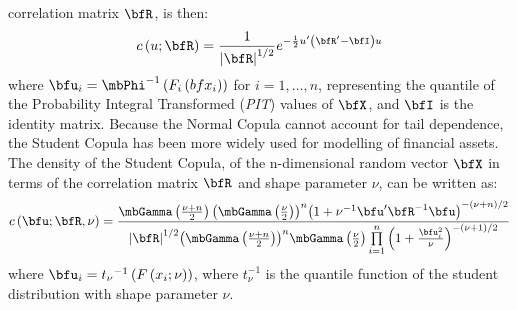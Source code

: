 correlation matrix $\bfR$, is then:
\begin{equation}\label{eq:copula5}
c\left( {u;\bfR} \right) = \frac{1}{{{{\left| \bfR \right|}^{1/2}}}}{e^{ - \frac{1}{2}u'\left( {\bfR' - \bfI} \right)u}}
\end{equation}
where ${\bfu_i} = {\mbPhi ^{ - 1}}\left( {{F_i}\left( {{bfx_i}} \right)} \right)$
for $i=1,\dots,n$, representing the quantile of the Probability Integral
Transformed (\emph{PIT}) values of $\bfX$, and $\bfI$ is the identity matrix.
Because the Normal Copula cannot account for tail dependence, the Student Copula
has been more widely used for modelling of financial assets. The density of the
Student Copula, of the n-dimensional random vector $\bfX$ in terms of the
correlation matrix $\bfR$ and shape parameter $\nu$, can be written as:
\begin{equation}\label{eq:copula6}
c\left( {\bfu;\bfR,\nu } \right) = \frac{{\mbGamma \left( {\frac{{\nu  + n}}{2}} \right){{\left( {\mbGamma \left( {\frac{\nu }
{2}} \right)} \right)}^n}{{\left( {1 + {\nu ^{ - 1}}\bfu'{\bfR^{ - 1}}\bfu} \right)}^{ - \left( {\nu  + n} \right)/2}}}}
{{{{\left| \bfR \right|}^{1/2}}{{\left( {\mbGamma \left( {\frac{{\nu  + n}}{2}} \right)} \right)}^n}\mbGamma \left( {\frac{\nu }
{2}} \right)\prod\limits_{i = 1}^n {{{\left( {1 + \frac{{\bfu_i^2}}{\nu }} \right)}^{ - \left( {\nu  + 1} \right)/2}}} }}
\end{equation}\label{eq:copula7}
where ${\bfu_i} = {t_\nu }^{ - 1}\left( {F\left( {{x_i};\nu } \right)} \right)$,
where $t_\nu^{-1}$ is the quantile function of the student distribution with
shape parameter $\nu$.
